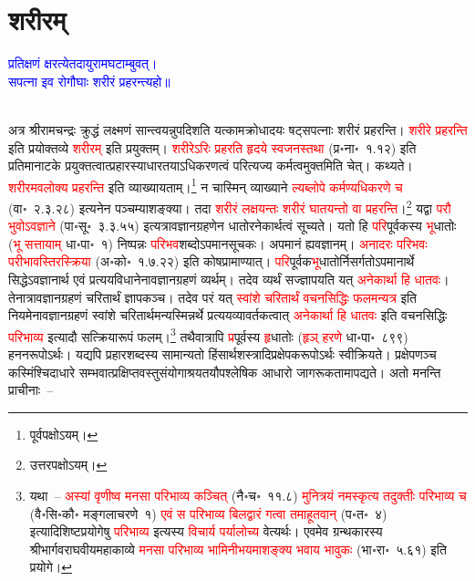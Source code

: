 \section[शरीरम्]{शरीरम्‌}
\centering\textcolor{blue}{प्रतिक्षणं क्षरत्येतदायुरामघटाम्बुवत्।\nopagebreak\\
सपत्ना इव रोगौघाः शरीरं प्रहरन्त्यहो॥}\nopagebreak\\
\\
\begin{sloppypar}\justifying\noindent\hspace{10mm} अत्र श्रीरामचन्द्रः क्रुद्धं लक्ष्मणं सान्त्वयन्नुपदिशति यत्काम\-क्रोधादयः षट्सपत्नाः शरीरं प्रहरन्ति। \textcolor{red}{शरीरे प्रहरन्ति} इति प्रयोक्तव्ये \textcolor{red}{शरीरम्‌} इति प्रयुक्तम्। \textcolor{red}{शरीरेऽरिः प्रहरति हृदये स्वजनस्तथा} (प्र॰ना॰~१.१२) इति प्रतिमानाटके प्रयुक्तत्वात्प्रहारस्याधार\-तयाऽधिकरणत्वं परित्यज्य कर्मत्वमुक्तमिति चेत्। कथ्यते। \textcolor{red}{शरीरमवलोक्य प्रहरन्ति} इति व्याख्यायताम्।\footnote{पूर्वपक्षोऽयम्।} न चास्मिन् व्याख्याने \textcolor{red}{ल्यब्लोपे कर्मण्यधिकरणे च} (वा॰~२.३.२८) इत्यनेन पञ्चम्याशङ्क्या। तदा \textcolor{red}{शरीरं लक्षयन्तः शरीरं घातयन्तो वा प्रहरन्ति}।\footnote{उत्तरपक्षोऽयम्।} यद्वा \textcolor{red}{परौ भुवोऽवज्ञाने} (पा॰सू॰~३.३.५५) इत्यत्रावज्ञान\-ग्रहणेन धातोरनेकार्थत्वं सूच्यते। यतो हि \textcolor{red}{परि}\-पूर्वकस्य \textcolor{red}{भू}\-धातोः (\textcolor{red}{भू सत्तायाम्} धा॰पा॰~१) निष्पन्नः \textcolor{red}{परिभव}\-शब्दोऽपमान\-सूचकः। अपमानं ह्यवज्ञानम्। \textcolor{red}{अनादरः परिभवः परीभावस्तिरस्क्रिया} (अ॰को॰~१.७.२२) इति कोष\-प्रामाण्यात्। \textcolor{red}{परि}\-पूर्वक\-\textcolor{red}{भू}\-धातोर्निसर्गतोऽप\-मानार्थे सिद्धेऽवज्ञानार्थ एवं प्रत्यय\-विधानेनावज्ञान\-ग्रहणं व्यर्थम्। तदेव व्यर्थं सज्ज्ञापयति यत् \textcolor{red}{अनेकार्था हि धातवः}। तेनात्रावज्ञान\-ग्रहणं चरितार्थं ज्ञापकञ्च। तदेव परं यत् \textcolor{red}{स्वांशे चरितार्थं वचन\-सिद्धिः फलमन्यत्र} इति नियमेनावज्ञान\-ग्रहणं स्वांशे चरितार्थमन्यस्मिन्नर्थे प्रत्यय\-व्यावर्तकत्वात् \textcolor{red}{अनेकार्था हि धातवः} इति वचन\-सिद्धिः \textcolor{red}{परिभाव्य} इत्यादौ
सत्क्रिया\-रूपं फलम्।\footnote{यथा~– \textcolor{red}{अस्यां वृणीष्व मनसा परिभाव्य कञ्चित्} (नै॰च॰~११.८) \textcolor{red}{मुनित्रयं नमस्कृत्य तदुक्तीः परिभाव्य च} (वै॰सि॰कौ॰ मङ्गलाचरणे~१) \textcolor{red}{एवं स परिभाव्य बिलद्वारं गत्वा तमाहूतवान्} (प॰त॰~४) इत्यादि\-शिष्ट\-प्रयोगेषु \textcolor{red}{परिभाव्य} इत्यस्य \textcolor{red}{विचार्य पर्यालोच्य} वेत्यर्थः। एवमेव ग्रन्थकारस्य श्रीभार्गव\-राघवीय\-महाकाव्ये \textcolor{red}{मनसा परिभाव्य भामिनीभयमाशङ्क्य भवाय भावुकः} (भा॰रा॰~५.६१) इति प्रयोगे।} तथैवात्रापि \textcolor{red}{प्र}\-पूर्वस्य \textcolor{red}{हृ}\-धातोः (\textcolor{red}{हृञ् हरणे} धा॰पा॰~८९९) हनन\-रूपोऽर्थः। यद्यपि प्रहार\-शब्दस्य सामान्यतो हिंसार्थ\-शस्त्रादि\-प्रक्षेपक\-रूपोऽर्थः स्वीक्रियते। प्रक्षेपणञ्च कस्मिंश्चिदाधारे सम्भवात्प्रक्षिप्त\-वस्तु\-संयोगाश्रयतयौपश्लेषिक आधारो जागरूकतामापद्यते। अतो मनन्ति प्राचीनाः~–\end{sloppypar}
